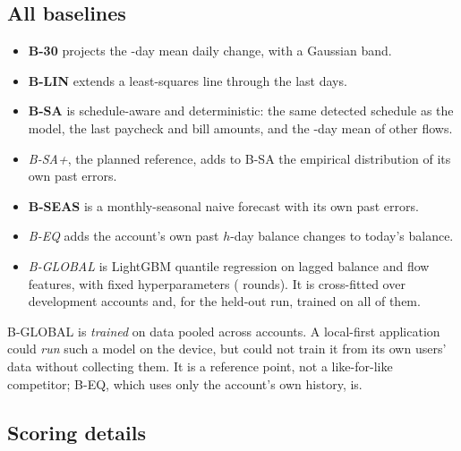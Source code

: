 \subsection{All baselines}
\begin{itemize}
\item \textbf{B-30} projects the -day mean daily change,
  with a Gaussian band.
\item \textbf{B-LIN} extends a least-squares line through the last
   days.
\item \textbf{B-SA} is schedule-aware and deterministic: the same detected
  schedule as the model, the last paycheck and bill amounts, and the
  -day mean of other flows.
\item \emph{B-SA+}, the planned reference, adds to B-SA the empirical
  distribution of its own past errors.
\item \textbf{B-SEAS} is a monthly-seasonal naive forecast with its own
  past errors.
\item \emph{B-EQ} adds the account's own past $h$-day balance changes to
  today's balance.
\item \emph{B-GLOBAL} is LightGBM quantile regression
  \citep{ke2017lightgbm} on lagged balance and flow features, with fixed
  hyperparameters ( rounds). It is cross-fitted over
  development accounts and, for the held-out run, trained on all of them.
\end{itemize}
B-GLOBAL is \emph{trained} on data pooled across accounts. A local-first
application could \emph{run} such a model on the device, but could not
train it from its own users' data without collecting them. It is a
reference point, not a like-for-like competitor; B-EQ, which uses only the
account's own history, is.


\subsection{Scoring details}
\label{sec:scoring}
